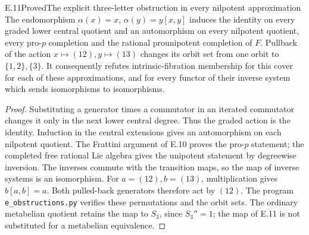 \begin{statement}{E.11}{Proved}{The explicit three-letter obstruction in every nilpotent approximation}
The endomorphism $\alpha(x)=x$, $\alpha(y)=y[x,y]$ induces the
identity on every graded lower central quotient and an
automorphism on every nilpotent quotient, every pro-$p$
completion and the rational prounipotent completion of $F$.
Pullback of the action $x\mapsto(12),y\mapsto(13)$ changes its
orbit set from one orbit to $\{1,2\},\{3\}$.
It consequently refutes intrinsic-fibration membership for this
cover for each of these approximations, and for every functor
of their inverse system which sends isomorphisms to isomorphisms.
\end{statement}
\begin{proof}
Substituting a generator times a commutator in an iterated
commutator changes it only in the next lower central degree.
Thus the graded action is the identity. Induction in the central
extensions gives an automorphism on each nilpotent quotient.
The Frattini argument of E.10 proves the pro-$p$ statement;
the completed free rational Lie algebra gives the unipotent
statement by degreewise inversion. The inverses commute with
the transition maps, so the map of inverse systems is an
isomorphism. For $a=(12),b=(13)$, multiplication gives
$b[a,b]=a$. Both pulled-back generators therefore act by
$(12)$. The program \texttt{e\_obstructions.py} verifies these
permutations and the orbit sets. The ordinary metabelian quotient
retains the map to $S_3$, since $S_3''=1$; the map of E.11 is
not substituted for a metabelian equivalence.
\end{proof}

